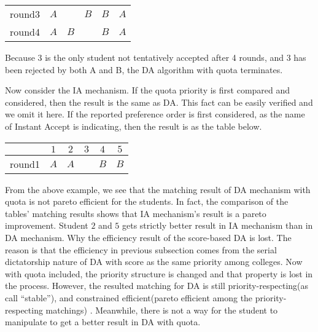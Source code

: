 \begin{example}
\begin{center}
\begin{tabular}{|c|c|c|c|c|c|}
    round3&$A$ &   & $B$ & $B$ &  $A$\\

    round4&$A$ & $B$ &  & $B$ &  $A$ \\
    \hline
    
  \end{tabular}
\end{center}

Because 3 is the only student not tentatively accepted after 4 rounds,
and 3 has been rejected by both A and B, the DA algorithm with quota
terminates.

Now consider the IA mechanism. If the quota priority is first compared
and considered, then the result is the same as DA. This fact can be
easily verified and we omit it here.  If the reported preference
order is first considered, as the name of Instant Accept is
indicating, then the result is as the table below.

\begin{center}
      \begin{tabular}{|c|c|c|c|c|c|}
        \hline
        &$1$ & $2$ & $3$ & $4$ & $5$\\
        \hline
       round1& $A$ & $A$ &  & $B$ & $B$ \\
        
        \hline
        
      \end{tabular}
    \end{center}

\end{example}

From the above example, we see that the matching result of DA mechanism with quota is not pareto efficient for the students. In fact, the comparison of the tables' 
matching results shows that IA 
mechanism's result is a pareto improvement. Student $2$ and $5$ gets strictly better result in IA mechanism than in DA mechanism. Why the efficiency result of the score-based DA is lost. The reason is that the efficiency in previous subsection comes from the serial dictatorship nature of DA with score as the same priority among colleges. Now with quota included, the priority structure is changed and that property is lost in the process. However, the resulted matching for DA is still priority-respecting(as \parencite{Svensson2014} call ``stable''), and constrained efficient(pareto efficient among the priority-respecting matchings) . Meanwhile, there is not a way for the student to manipulate to get a better result in DA with quota.

